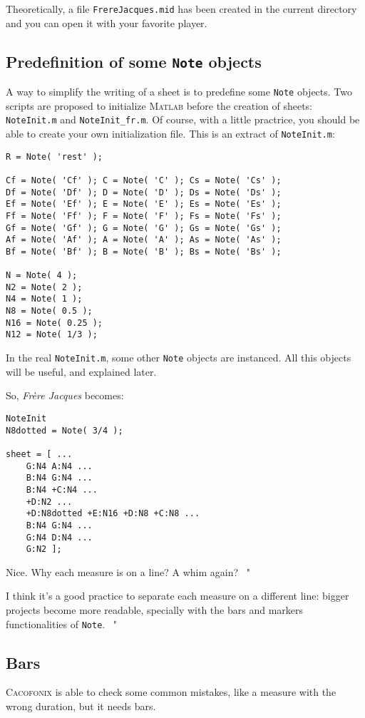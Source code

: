 \documentclass{article}
\newcommand\cacofonix{\textsc{Cacofonix}\xspace}
\newcommand\matlab{\textsc{Matlab}\xspace}
\newcommand\note{\lstinline!Note!\xspace}
\newcommand\frerejaques{\emph{Fr\`ere Jacques}\xspace}
\newcommand\noteInitFile{\texttt{NoteInit.m}\xspace}
\newcommand\noteInitFrFile{\texttt{NoteInit\_fr.m}\xspace}
\newenvironment{meenv}{ \par \noindent \makebox[6em][r]{ \textcolor{mecolor}{Me}: " --~}}{~"}
\newenvironment{myselfenv}{ \par \noindent \makebox[6em][r]{ \textcolor{myselfcolor}{Myself}: " --~}}{~"}
\newcommand{ \me }[1]{%
\begin{meenv}%
	#1%
\end{meenv} }
\newcommand{ \myself }[1]{%
\begin{myselfenv}%
	#1%
\end{myselfenv} }
\begin{document}
Theoretically, a file \texttt{FrereJacques.mid} has been created in the current directory and you can open it with your favorite player.

\subsection{Predefinition of some \note objects}

A way to simplify the writing of a sheet is to predefine some \note objects. Two scripts are proposed to initialize \matlab before the creation of sheets: \noteInitFile and \noteInitFrFile. Of course, with a little practrice, you should be able to create your own initialization file. This is an extract of \noteInitFile:
\begin{lstlisting}
R = Note( 'rest' );

Cf = Note( 'Cf' ); C = Note( 'C' ); Cs = Note( 'Cs' );
Df = Note( 'Df' ); D = Note( 'D' ); Ds = Note( 'Ds' );
Ef = Note( 'Ef' ); E = Note( 'E' ); Es = Note( 'Es' );
Ff = Note( 'Ff' ); F = Note( 'F' ); Fs = Note( 'Fs' );
Gf = Note( 'Gf' ); G = Note( 'G' ); Gs = Note( 'Gs' );
Af = Note( 'Af' ); A = Note( 'A' ); As = Note( 'As' );
Bf = Note( 'Bf' ); B = Note( 'B' ); Bs = Note( 'Bs' );

N = Note( 4 );
N2 = Note( 2 );
N4 = Note( 1 );
N8 = Note( 0.5 );
N16 = Note( 0.25 );
N12 = Note( 1/3 );
\end{lstlisting}

In the real \noteInitFile, some other \note objects are instanced. All this objects will be useful, and explained later.

So, \frerejaques becomes:
\begin{lstlisting}
NoteInit
N8dotted = Note( 3/4 );

sheet = [ ...
	G:N4 A:N4 ...
	B:N4 G:N4 ...
	B:N4 +C:N4 ...
	+D:N2 ...
	+D:N8dotted +E:N16 +D:N8 +C:N8 ...
	B:N4 G:N4 ...
	G:N4 D:N4 ...
	G:N2 ];
\end{lstlisting}

\me{Nice. Why each measure is on a line? A whim again?}
\myself{I think it's a good practice to separate each measure on a different line: bigger projects become more readable, specially with the bars and markers functionalities of \note.}

\subsection{Bars}

\cacofonix is able to check some common mistakes, like a measure with the wrong duration, but it needs bars.
\end{document}
